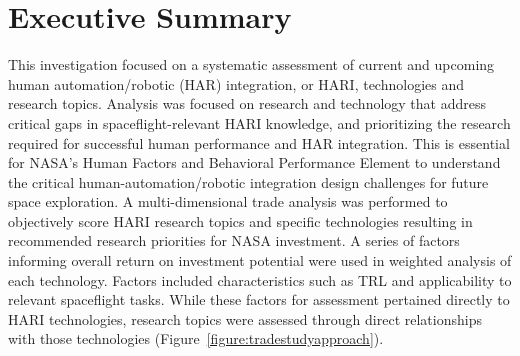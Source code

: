 \section{Executive Summary}
This investigation focused on a systematic assessment of current and upcoming human automation/robotic (HAR) integration, or HARI, technologies and research topics.
Analysis was focused on research and technology that address critical gaps in spaceflight-relevant HARI knowledge, and prioritizing the research required for successful human performance and HAR integration.
This is essential for NASA's Human Factors and Behavioral Performance Element to understand the critical human-automation/robotic integration design challenges for future space exploration.
A multi-dimensional trade analysis was performed to objectively score HARI research topics and specific technologies resulting in recommended research priorities for NASA investment.
A series of factors informing overall return on investment potential were used in weighted analysis of each technology.
Factors included characteristics such as TRL and applicability to relevant spaceflight tasks.
While these factors for assessment pertained directly to HARI technologies, research topics were assessed through direct relationships with those technologies (Figure~\ref{figure:tradestudyapproach}).

